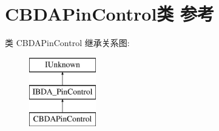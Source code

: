 \hypertarget{class_c_b_d_a_pin_control}{}\section{C\+B\+D\+A\+Pin\+Control类 参考}
\label{class_c_b_d_a_pin_control}
类 C\+B\+D\+A\+Pin\+Control 继承关系图\+:\begin{figure}[H]
\begin{center}
\leavevmode
\includegraphics[height=3.000000cm]{class_c_b_d_a_pin_control}
\end{center}
\end{figure}
